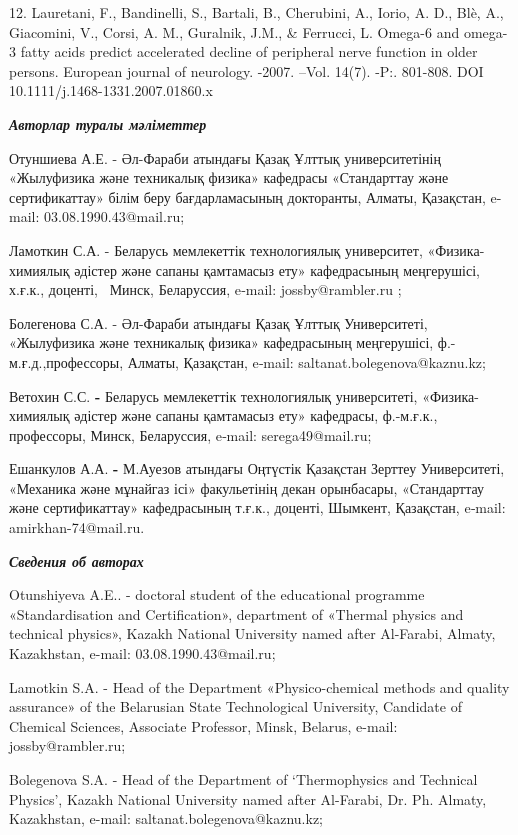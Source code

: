 12. Lauretani, F., Bandinelli, S., Bartali, B., Cherubini, A., Iorio, A.
D., Blè, A., Giacomini, V., Corsi, A. M., Guralnik, J.M., \& Ferrucci,
L. Omega-6 and omega-3 fatty acids predict accelerated decline of
peripheral nerve function in older persons. European journal of
neurology. -2007. --Vol. 14(7). -P:. 801-808. DOI
10.1111/j.1468-1331.2007.01860.x

\emph{{\bfseries Авторлар туралы мәліметтер}}

Отуншиева А.Е. - Әл-Фараби атындағы Қазақ Ұлттық университетінің
«Жылуфизика және техникалық физика» кафедрасы «Стандарттау және
сертификаттау» білім беру бағдарламасының докторанты, Алматы, Қазақстан,
e-mail: 03.08.1990.43@mail.ru;

Ламоткин С.А. - Беларусь мемлекеттік технологиялық университет,
«Физика-химиялық әдістер және сапаны қамтамасыз ету» кафедрасының
меңгерушісі, х.ғ.к., доценті,~ Минск, Беларуссия, e‑mail:
jossby@rambler.ru ;

Болегенова С.А. - Әл-Фараби атындағы Қазақ Ұлттық Университеті,
«Жылуфизика және техникалық физика» кафедрасының меңгерушісі,
ф.-м.ғ.д.,профессоры, Алматы, Қазақстан, e‑mail:
saltanat.bolegenova@kaznu.kz;

Ветохин С.С. {\bfseries -} Беларусь мемлекеттік технологиялық университеті,
«Физика-химиялық әдістер және сапаны қамтамасыз ету» кафедрасы,
ф.-м.ғ.к., профессоры, Минск, Беларуссия, e‑mail: serega49@mail.ru;

Ешанкулов А.А. {\bfseries -} М.Ауезов атындағы Оңтүстік Қазақстан Зерттеу
Университеті, «Механика және мұнайгаз ісі» факульетінің декан
орынбасары, «Стандарттау және сертификаттау» кафедрасының т.ғ.к.,
доценті, Шымкент, Қазақстан, e‑mail: amirkhan-74@mail.ru.

\emph{{\bfseries Сведения об авторах}}

Otunshiyeva A.E.. - doctoral student of the educational programme
«Standardisation and Certification», department of «Thermal physics and
technical physics», Kazakh National University named after Al-Farabi,
Almaty, Kazakhstan, e-mail: 03.08.1990.43@mail.ru;

Lamotkin S.A. - Head of the Department «Physico-chemical methods and
quality assurance» of the Belarusian State Technological University,
Candidate of Chemical Sciences, Associate Professor, Minsk, Belarus,
e-mail: jossby@rambler.ru;

Bolegenova S.A. - Head of the Department of `Thermophysics and Technical
Physics', Kazakh National University named after Al-Farabi, Dr. Ph.
Almaty, Kazakhstan, e-mail: saltanat.bolegenova@kaznu.kz;

